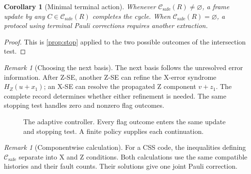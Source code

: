 \documentclass[11pt,a4paper]{article}
\newtheorem{corollary}[theorem]{Corollary}
\theoremstyle{definition}
\theoremstyle{remark}
\newtheorem{remark}[theorem]{Remark}
\newcommand{\Hist}{\mathcal H}
\newcommand{\Safe}{\mathcal C_{\mathrm{safe}}}
\begin{document}
\begin{corollary}[Minimal terminal action]
Whenever $\Safe(R)\ne\varnothing$, a frame update by any
$C\in\Safe(R)$ completes the cycle. When $\Safe(R)=\varnothing$,
a protocol using terminal Pauli corrections requires another extraction.
\end{corollary}
\begin{proof}
This is \cref{prop:stop} applied to the two possible outcomes of the
intersection test.
\end{proof}

\begin{remark}[Choosing the next basis]
The next basis follows the unresolved error information. After Z-SE,
another Z-SE can refine the X-error syndrome $H_Z(u+x_1)$; an X-SE can
resolve the propagated Z component $v+z_1$. The complete record determines
whether either refinement is needed. The same stopping test handles
zero and nonzero flag outcomes.
\end{remark}

\begin{figure}[H]
\centering
{}
\caption{The adaptive controller. Every flag outcome enters the same
update and stopping test. A finite policy supplies each continuation.}
\label{fig:controller}
\end{figure}

\begin{remark}[Componentwise calculation]
For a CSS code, the inequalities defining $\Safe$ separate into X and Z
conditions. Both calculations use the same compatible histories and their
fault counts. Their solutions give one joint Pauli correction.
\end{remark}
\FloatBarrier
\end{document}
